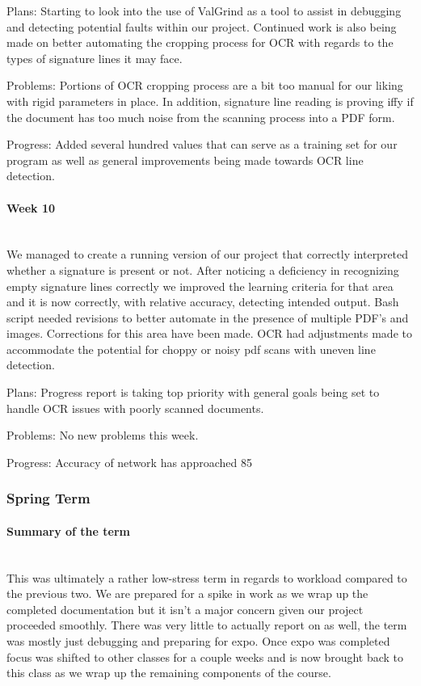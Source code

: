 \documentclass[article, onecolumn, draftclsnofoot,10pt, compsoc]{IEEEtran}
\begin{document}
Plans:
Starting to look into the use of ValGrind as a tool to assist in debugging and detecting potential faults within our project. Continued work is also being made on better automating the cropping process for OCR with regards to the types of signature lines it may face.
 
Problems:
Portions of OCR cropping process are a bit too manual for our liking with rigid parameters in place. In addition, signature line reading is proving iffy if the document has too much noise from the scanning process into a PDF form.
 
Progress:
Added several hundred values that can serve as a training set for our program as well as general improvements being made towards OCR line detection.

\paragraph{Week 10}
\mbox{}\\
We managed to create a running version of our project that correctly interpreted whether a signature is present or not. After noticing a deficiency in recognizing empty signature lines correctly we improved the learning criteria for that area and it is now correctly, with relative accuracy, detecting intended output. Bash script needed revisions to better automate in the presence of multiple PDF's and images. Corrections for this area have been made. OCR had adjustments made to accommodate the potential for choppy or noisy pdf scans with uneven line detection. 
 
Plans:
Progress report is taking top priority with general goals being set to handle OCR issues with poorly scanned documents.
 
Problems:
No new problems this week.
 
Progress:
Accuracy of network has approached 85%

\subsubsection{Spring Term}
\paragraph{Summary of the term}
\mbox{}\\
This was ultimately a rather low-stress term in regards to workload compared to the previous two. We are prepared for a spike in work as we wrap up the completed documentation but it isn't a major concern given our project proceeded smoothly. There was very little to actually report on as well, the term was mostly just debugging and preparing for expo. Once expo was completed focus was shifted to other classes for a couple weeks and is now brought back to this class as we wrap up the remaining components of the course.
 
\end{document}
